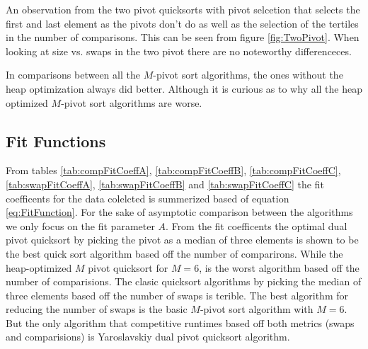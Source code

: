 		An observation from the two pivot quicksorts with pivot selcetion that selects
		the first and last element as the pivots don't do as well as the selection of 
		the tertiles in the number of comparisons. This can be seen from figure \ref{fig:TwoPivot}. 
		When looking at size vs. swaps in the two pivot there are no noteworthy differenceces. 
		
		
		

		In comparisons between all the $M$-pivot sort algorithms, the ones
		without the heap optimization always did better. Although it is curious
		as to why all the heap optimized $M$-pivot sort algorithms are worse.


	\subsection{Fit Functions}
		
		From tables \ref{tab:compFitCoeffA}, \ref{tab:compFitCoeffB},
		\ref{tab:compFitCoeffC}, \ref{tab:swapFitCoeffA}, \ref{tab:swapFitCoeffB}
		and \ref{tab:swapFitCoeffC} the fit coefficents for the data colelcted is
		summerized based of equation \ref{eq:FitFunction}. 
		For the sake of asymptotic comparison between the algorithms we only focus
		on the fit parameter $A$. 
		From the fit coefficents the optimal dual pivot quicksort by picking the
		pivot as a median of three elements is shown to be the best quick sort
		algorithm based off the number of comparirons.
		While the heap-optimized $M$ pivot quicksort for $M=6$, is the worst
		algorithm based off the number of comparisions.
		The clasic quicksort algorithms by picking the median of three elements
		based off the number of swaps is terible. 
		The best algorithm for reducing the number of swaps is the basic
		$M$-pivot sort algorithm with $M=6$.
		But the only algorithm that competitive runtimes based off both metrics
		(swaps and comparisions) is Yaroslavskiy dual pivot quicksort algorithm.
		

